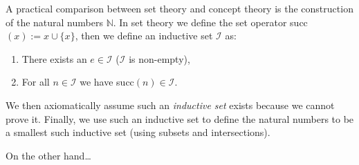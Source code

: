 \documentclass[twoside]{article}
\begin{document}
A practical comparison between set theory and concept theory is the construction of the natural numbers $ \mathbb{N} $.
In set theory we define the set operator succ$ (x) := x \cup \{x\} $, then we define an inductive set $ \mathcal{I} $ as:
\begin{enumerate}
\item There exists an $ e \in \mathcal{I} $ ($ \mathcal{I} $ is non-empty),
\item For all $ n \in \mathcal{I} $ we have succ$ (n) \in \mathcal{I} $.
\end{enumerate}
We then axiomatically assume such an \emph{inductive set} exists because we cannot prove it. Finally, we use such an
inductive set to define the natural numbers to be a smallest such inductive set (using subsets and intersections).

On the other hand\ldots
\end{document}
